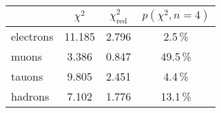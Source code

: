 \begin{tabular}{lS[table-format=2.3]S[table-format=1.3]S[table-format=2.1]}
	\toprule
	& {$\chi^2$} & {$\chi_\mathrm{red}^2$} & {$p(\chi^2, n=4)$} \\
	\midrule
	electrons & 11.185 & 2.796 & 2.5\,\% \\
	muons & 3.386 & 0.847 & 49.5\,\% \\
	tauons & 9.805 & 2.451 & 4.4\,\% \\
	hadrons & 7.102 & 1.776 & 13.1\,\% \\
	\bottomrule
\end{tabular}